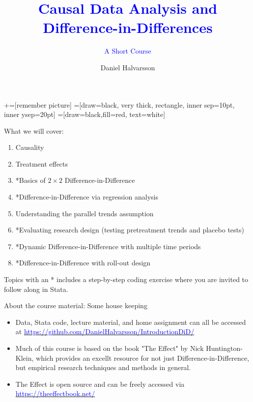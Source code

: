 \documentclass[notes,11pt, aspectratio=169]{beamer}
\title[]{\textcolor{blue}{Causal Data Analysis and Difference-in-Differences}}
\subtitle[]{\textcolor{blue}{A Short Course}}
\author[DH]{Daniel Halvarsson}
\institute{The Ratio Institute, Stockholm\\
\vspace{0.2cm}
 \href{daniel.halvarsson@ratio.se}{daniel.halvarsson@ratio.se}}
\date{}
\begin{document}
\newcommand\marktopleft[1]{%
    \tikz[overlay,remember picture] 
        \node (marker-#1-a) at (-.3em,.3em) {};%
}
\newcommand\markbottomright[2]{%
    \tikz[overlay,remember picture] 
        \node (marker-#1-b) at (0em,0em) {};%
}
+=[remember picture] 
 =[draw=black, very thick, rectangle, inner sep=10pt, inner ysep=20pt]
 =[draw=black,fill=red, text=white]

\begin{frame}
\maketitle
\end{frame}

\begin{frame}{What we will cover:}
\begin{enumerate}
\item Causality
\item Treatment effects 
\item *Basics of $2\times 2$ Difference-in-Difference
\item *Difference-in-Difference via regression analysis
\item Understanding the parallel trends assumption
\item *Evaluating research design (testing pretreatment trends and placebo tests)
\item *Dynamic Difference-in-Difference with multiple time periods
\item *Difference-in-Difference with roll-out design 
\end{enumerate}
\vspace{0.5cm}
Topics with an * includes a step-by-step coding exercise where you are invited to follow along in Stata. 
\end{frame} 

\begin{frame}{About the course material: Some house keeping}
\begin{itemize}
    \item Data, Stata code, lecture material, and home assignment can all be accessed at 
    \href{https://github.com/DanielHalvarsson/IntroductionDiD/}{\textcolor{blue}{https://github.com/DanielHalvarsson/IntroductionDiD/}}

    \item Much of this course is based on the book "The Effect" by Nick Huntington-Klein, which provides an excellt resource for not just Difference-in-Difference, but empirical research techniques and methods in general.

    \item The Effect is open source and can be freely accessed via 
    \href{https://theeffectbook.net/}{\textcolor{blue}{https://theeffectbook.net/}}
\end{itemize}
\end{frame} 
\end{document}
